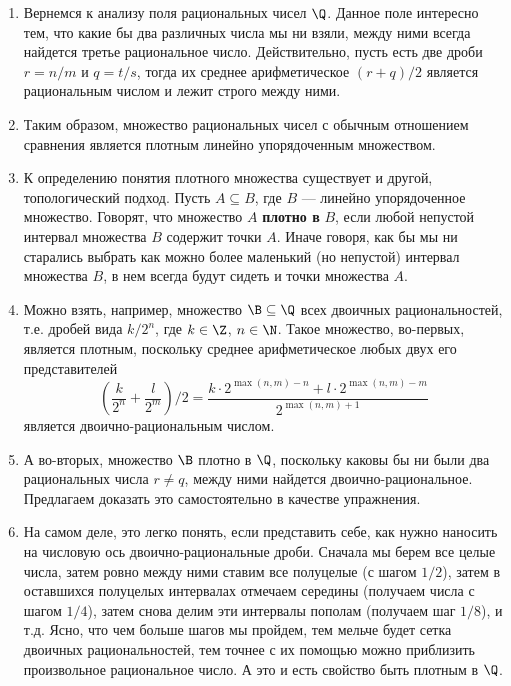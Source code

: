\begin{enumerate}
\item Вернемся к анализу поля рациональных чисел $\Q$. Данное поле интересно тем, что какие бы два различных числа мы ни взяли, между ними всегда найдется третье рациональное число. Действительно, пусть есть две дроби $r=n/m$ и $q=t/s$, тогда их среднее арифметическое $(r+q)/2$ является рациональным числом и лежит строго между ними.
\item Таким образом, множество рациональных чисел с обычным отношением сравнения является плотным линейно упорядоченным множеством.
\item К определению понятия плотного множества существует и другой, топологический подход. Пусть $A\subseteq B$, где $B$ --- линейно упорядоченное множество. Говорят, что множество $A$ \textbf{плотно в} $B$, если любой непустой интервал множества $B$ содержит точки $A$. Иначе говоря, как бы мы ни старались выбрать как можно более маленький (но непустой) интервал множества $B$, в нем всегда будут сидеть и точки множества $A$.
\item Можно взять, например, множество $\B\subseteq\Q$ всех двоичных рациональностей, т.е. дробей вида $k/2^n$, где $k\in\Z$, $n\in\N$. Такое множество, во-первых, является плотным, поскольку среднее арифметическое любых двух его представителей
$$
\left(\frac{k}{2^n}+\frac{l}{2^m}\right)/2 = \frac{k\cdot 2^{\max(n,m)-n}+l\cdot 2^{\max(n,m)-m}}{2^{\max(n,m)+1}}
$$
является двоично-рациональным числом.
\item А во-вторых, множество $\B$ плотно в $\Q$, поскольку каковы бы ни были два рациональных числа $r\ne q$, между ними найдется двоично-рациональное. Предлагаем доказать это самостоятельно в качестве упражнения.
\item На самом деле, это легко понять, если представить себе, как нужно наносить на числовую ось двоично-рациональные дроби. Сначала мы берем все целые числа, затем ровно между ними ставим все полуцелые (с шагом $1/2$), затем в оставшихся полуцелых интервалах отмечаем середины (получаем числа с шагом $1/4$), затем снова делим эти интервалы пополам (получаем шаг $1/8$), и т.д. Ясно, что чем больше шагов мы пройдем, тем мельче будет сетка двоичных рациональностей, тем точнее с их помощью можно приблизить произвольное рациональное число. А это и есть свойство быть плотным в $\Q$.

\end{enumerate}
